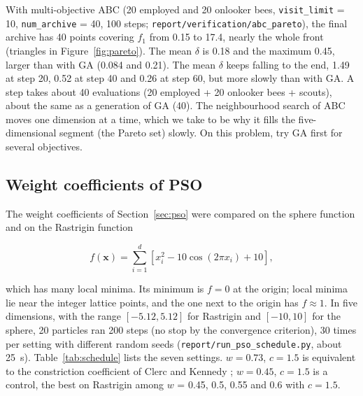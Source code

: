 \documentclass[11pt,a4paper]{article}
\begin{document}
With multi-objective ABC (20 employed and 20 onlooker bees, \texttt{visit\_limit} = 10, \texttt{num\_archive} = 40, 100 steps; \texttt{report/verification/abc\_pareto}), the final archive has 40 points covering $f_1$ from 0.15 to 17.4, nearly the whole front (triangles in Figure~\ref{fig:pareto}). The mean $\delta$ is 0.18 and the maximum 0.45, larger than with GA (0.084 and 0.21). The mean $\delta$ keeps falling to the end, 1.49 at step 20, 0.52 at step 40 and 0.26 at step 60, but more slowly than with GA. A step takes about 40 evaluations (20 employed + 20 onlooker bees + scouts), about the same as a generation of GA (40). The neighbourhood search of ABC moves one dimension at a time, which we take to be why it fills the five-dimensional segment (the Pareto set) slowly. On this problem, try GA first for several objectives.

\subsection{Weight coefficients of PSO}\label{sec:val-schedule}

The weight coefficients of Section~\ref{sec:pso} were compared on the sphere function and on the Rastrigin function

\begin{equation}
  f(\mathbf{x}) = \sum_{i=1}^{d} \left[ x_i^2 - 10 \cos(2\pi x_i) + 10 \right],
\end{equation}

which has many local minima. Its minimum is $f = 0$ at the origin; local minima lie near the integer lattice points, and the one next to the origin has $f \approx 1$. In five dimensions, with the range $[-5.12, 5.12]$ for Rastrigin and $[-10, 10]$ for the sphere, 20 particles ran 200 steps (no stop by the convergence criterion), 30 times per setting with different random seeds (\texttt{report/run\_pso\_schedule.py}, about 25~s). Table~\ref{tab:schedule} lists the seven settings. $w = 0.73$, $c = 1.5$ is equivalent to the constriction coefficient of Clerc and Kennedy \cite{clerc2002}; $w = 0.45$, $c = 1.5$ is a control, the best on Rastrigin among $w$ = 0.45, 0.5, 0.55 and 0.6 with $c = 1.5$.
\end{document}
